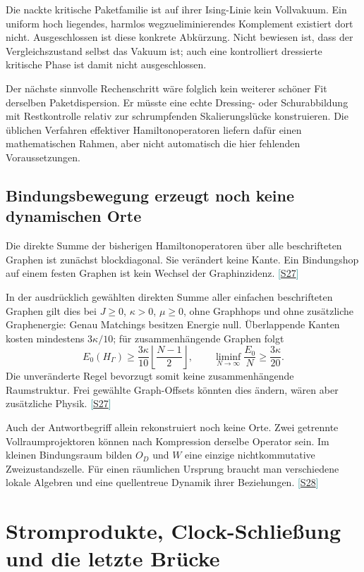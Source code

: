 \documentclass[11pt,a4paper,oneside,parskip=half,headings=normal,numbers=noenddot,bibliography=totoc]{scrreprt}
\newcommand{\src}[1]{\textcolor{teal}{\small[\hyperref[s:#1]{S#1}]}}
\newcommand{\finding}[2]{\begin{tcolorbox}[enhanced,breakable,colback=pale,colframe=teal,boxrule=0pt,borderline west={2pt}{0pt}{teal},arc=0mm,left=3mm,right=3mm,top=2mm,bottom=2mm,title={#1},coltitle=ink,colbacktitle=pale,fonttitle=\sffamily\bfseries]#2\end{tcolorbox}}
\begin{document}
\finding{Was damit entschieden ist}{Die nackte kritische Paketfamilie ist auf ihrer Ising-Linie kein Vollvakuum. Ein uniform hoch liegendes, harmlos wegzueliminierendes Komplement existiert dort nicht. Ausgeschlossen ist diese konkrete Abkürzung. Nicht bewiesen ist, dass der Vergleichszustand selbst das Vakuum ist; auch eine kontrolliert dressierte kritische Phase ist damit nicht ausgeschlossen.}

Der nächste sinnvolle Rechenschritt wäre folglich kein weiterer schöner Fit derselben Paketdispersion. Er müsste eine echte Dressing- oder Schurabbildung mit Restkontrolle relativ zur schrumpfenden Skalierungslücke konstruieren. Die üblichen Verfahren effektiver Hamiltonoperatoren liefern dafür einen mathematischen Rahmen, aber nicht automatisch die hier fehlenden Voraussetzungen. \cite{sw}

\section{Bindungsbewegung erzeugt noch keine dynamischen Orte}
Die direkte Summe der bisherigen Hamiltonoperatoren über alle beschrifteten Graphen ist zunächst blockdiagonal. Sie verändert keine Kante. Ein Bindungshop auf einem festen Graphen ist kein Wechsel der Graphinzidenz. \src{27}

In der ausdrücklich gewählten direkten Summe aller einfachen beschrifteten Graphen gilt dies bei $J\ge0$, $\kappa>0$, $\mu\ge0$, ohne Graphhops und ohne zusätzliche Graphenergie: Genau Matchings besitzen Energie null. Überlappende Kanten kosten mindestens $3\kappa/10$; für zusammenhängende Graphen folgt
\[
 E_0(H_\Gamma)\ge\frac{3\kappa}{10}\left\lfloor\frac{N-1}{2}\right\rfloor,
 \qquad\liminf_{N\to\infty}\frac{E_0}{N}\ge\frac{3\kappa}{20}.
\]
Die unveränderte Regel bevorzugt somit keine zusammenhängende Raumstruktur. Frei gewählte Graph-Offsets könnten dies ändern, wären aber zusätzliche Physik. \src{27}

Auch der Antwortbegriff allein rekonstruiert noch keine Orte. Zwei getrennte Vollraumprojektoren können nach Kompression derselbe Operator sein. Im kleinen Bindungsraum bilden $O_D$ und $W$ eine einzige nichtkommutative Zweizustandszelle. Für einen räumlichen Ursprung braucht man verschiedene lokale Algebren und eine quellentreue Dynamik ihrer Beziehungen. \src{28}

\chapter{Stromprodukte, Clock-Schließung und die letzte Brücke}
\end{document}
